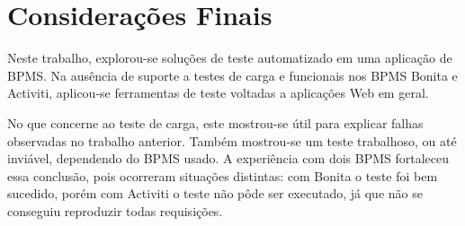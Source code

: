 \documentclass[12pt]{article}
\begin{document}

\section{Considerações Finais}\label{s:conclu}
Neste trabalho, explorou-se soluções de teste automatizado em uma aplicação de BPMS. Na ausência de suporte a testes de carga e funcionais nos BPMS Bonita e Activiti, aplicou-se ferramentas de teste voltadas a aplicações Web em geral. 



No que concerne ao teste de carga, este mostrou-se útil para explicar falhas observadas no trabalho anterior. Também mostrou-se um teste trabalhoso, ou até inviável, dependendo do BPMS usado. A experiência com dois BPMS fortaleceu essa conclusão, pois ocorreram situações distintas: com Bonita o teste foi bem sucedido, porém com Activiti o teste não pôde ser executado, já que não se conseguiu reproduzir todas requisições. 
\end{document}
